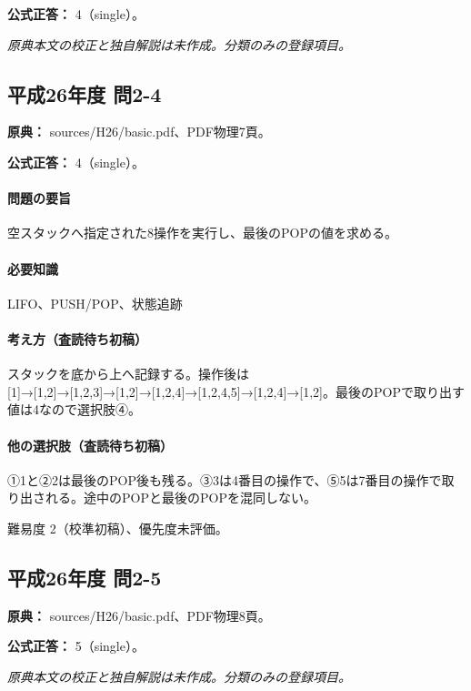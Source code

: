 \textbf{公式正答：} 4（single）。

\par\textit{原典本文の校正と独自解説は未作成。分類のみの登録項目。}

\subsection{平成26年度 問2-4}
\label{q:h26-reg-basic-2-4}

\noindent\textbf{原典：} sources/H26/basic.pdf、PDF物理7頁。

\textbf{公式正答：} 4（single）。

\paragraph{問題の要旨} 空スタックへ指定された8操作を実行し、最後のPOPの値を求める。

\paragraph{必要知識} LIFO、PUSH/POP、状態追跡

\paragraph{考え方（査読待ち初稿）} スタックを底から上へ記録する。操作後は [1]→[1,2]→[1,2,3]→[1,2]→[1,2,4]→[1,2,4,5]→[1,2,4]→[1,2]。最後のPOPで取り出す値は4なので選択肢④。

\paragraph{他の選択肢（査読待ち初稿）} ①1と②2は最後のPOP後も残る。③3は4番目の操作で、⑤5は7番目の操作で取り出される。途中のPOPと最後のPOPを混同しない。

\par 難易度 2（校準初稿）、優先度未評価。

\subsection{平成26年度 問2-5}
\label{q:h26-reg-basic-2-5}

\noindent\textbf{原典：} sources/H26/basic.pdf、PDF物理8頁。

\textbf{公式正答：} 5（single）。

\par\textit{原典本文の校正と独自解説は未作成。分類のみの登録項目。}

